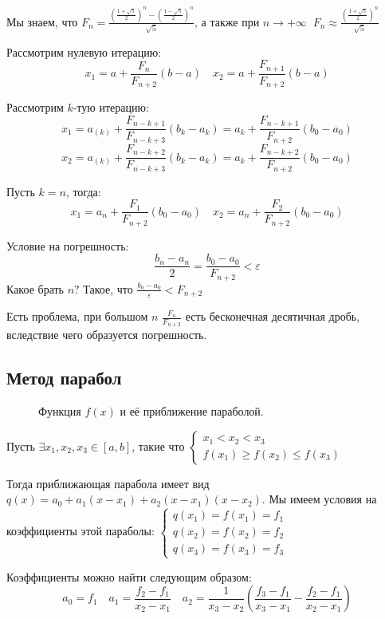Мы знаем, что \(F_n = \frac{\left( \frac{1 + \sqrt{5}}{2} \right)^n - \left( \frac{1 - \sqrt{5}}{2} \right)^n}{\sqrt{5}} \), а также при \(n \to +\infty\ \) \(F_n \approx \frac{\left( \frac{1 + \sqrt{5}}{2} \right)^n}{\sqrt{5}}\)

Рассмотрим нулевую итерацию:
\[x_1 = a + \frac{F_n}{F_{n + 2}} (b - a) \quad x_2 = a + \frac{F_{n+1}}{F_{n + 2}} (b - a)\]

Рассмотрим \(k\)-тую итерацию:
\[x_1 = a_{(k)} + \frac{F_{n - k + 1}}{F_{n - k + 3}} (b_k - a_k) = a_k + \frac{F_{n - k + 1}}{F_{n + 2}} (b_0 - a_0)\]
\[x_2 = a_{(k)} + \frac{F_{n - k + 2}}{F_{n - k + 3}} (b_k - a_k) = a_k + \frac{F_{n - k + 2}}{F_{n + 2}} (b_0 - a_0)\]

Пусть \(k = n\), тогда:
\[x_1 = a_n + \frac{F_1}{F_{n + 2}} (b_0 - a_0) \quad x_2 = a_n + \frac{F_2}{F_{n + 2}} (b_0 - a_0)\]

Условие на погрешность:
\[\frac{b_n - a_n}{2} = \frac{b_0 - a_0}{F_{n + 2}} < \varepsilon\]
Какое брать \(n?\) Такое, что \(\frac{b_0 - a_0}{\varepsilon} < F_{n + 2}\)

Есть проблема, при большом \(n\) \(\frac{F_n}{F_{n + 2}}\) есть бесконечная десятичная дробь, вследствие чего образуется погрешность.

\subsection{Метод парабол}

\begin{figure}[h]
    \centering
    
    \caption{Функция \(f(x)\) и её приближение параболой.}
\end{figure}

Пусть \(\exists x_1, x_2, x_3\in[a, b]\), такие что \(\begin{cases}
    x_1 < x_2 < x_3 \\
    f(x_1) \geq f(x_2) \leq f(x_3)
\end{cases}\)

Тогда приближающая парабола имеет вид \(q(x) = a_0 + a_1(x - x_1) + a_2(x - x_1)(x - x_2)\). Мы имеем условия на коэффициенты этой параболы: \(\begin{cases}
    q(x_1) = f(x_1) = f_1 \\
    q(x_2) = f(x_2) = f_2 \\
    q(x_3) = f(x_3) = f_3
\end{cases}\)

Коэффициенты можно найти следующим образом:
\[a_0 = f_1 \quad a_1 = \frac{f_2 - f_1}{x_2 - x_1} \quad a_2 = \frac{1}{x_3 - x_2} \left( \frac{f_3 - f_1}{x_3 - x_1} - \frac{f_2 - f_1}{x_2 - x_1} \right) \]

